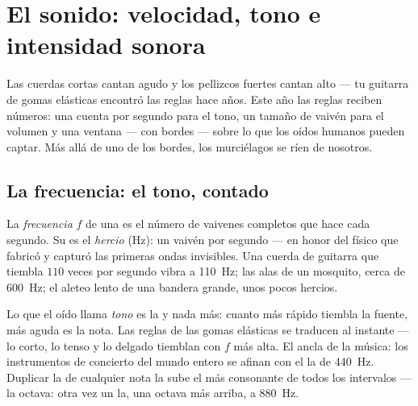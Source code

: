 \chapter{El sonido: velocidad, tono e intensidad sonora}\label{ch:g8:sound-pitch-loudness}

Las cuerdas cortas cantan agudo y los pellizcos fuertes cantan alto ---
tu guitarra de gomas elásticas encontró las reglas hace años. Este año
las reglas reciben números: una cuenta por segundo para el tono, un
tamaño de vaivén para el volumen y una ventana --- con bordes --- sobre
lo que los oídos humanos pueden captar. Más allá de uno de los bordes,
los murciélagos se ríen de nosotros.

\section{La frecuencia: el tono, contado}

\begin{definition}[Frecuencia]\label{def:g8:sound-pitch-loudness:frequency}
La \emph{frecuencia} $f$ de una  es
el número de vaivenes completos que hace cada segundo. Su
 es el \emph{hercio} (\unit{Hz}): un vaivén
por segundo --- en honor del físico que fabricó y capturó las primeras
ondas invisibles. Una cuerda de guitarra que tiembla $110$ veces por
segundo vibra a \qty{110}{Hz}; las alas de un mosquito, cerca de
\qty{600}{Hz}; el aleteo lento de una bandera grande, unos pocos
hercios.
\end{definition}

\begin{proposition}\label{prop:g8:sound-pitch-loudness:pitch}
Lo que el oído llama \emph{tono} es la  y nada más:
cuanto más rápido tiembla la fuente, más aguda es la nota. Las reglas
de las gomas elásticas se traducen al instante --- lo corto, lo tenso y
lo delgado tiemblan con $f$ más alta. El ancla de la música: los
instrumentos de concierto del mundo entero se afinan con el la de
\qty{440}{Hz}. Duplicar la  de cualquier nota la sube el
más consonante de todos los intervalos --- la octava: otra vez un la,
una octava más arriba, a \qty{880}{Hz}.
\end{proposition}

